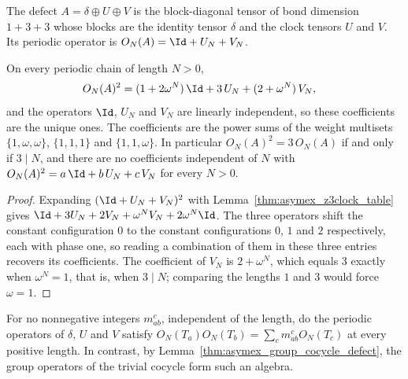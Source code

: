 \begin{definition}
    \label{def:asymex_z3clock_defect}
    \leanok
    The defect $A=\delta\oplus U\oplus V$ is the block-diagonal tensor of
    bond dimension $1+3+3$ whose blocks are the identity tensor $\delta$ and
    the clock tensors $U$ and $V$. Its periodic operator is
    $O_N(A)=\Id+U_N+V_N$.
\end{definition}

\begin{lemma}
    \label{thm:asymex_z3clock_defect_square}
    \leanok
    On every periodic chain of length $N>0$,
    \begin{align}
        O_N(A)^2 & =(1+2\omega^N)\,\Id+3\,U_N+(2+\omega^N)\,V_N,
    \end{align}
    and the operators $\Id$, $U_N$ and $V_N$ are linearly independent, so
    these coefficients are the unique ones. The coefficients are the power
    sums of the weight multisets $\{1,\omega,\omega\}$, $\{1,1,1\}$ and
    $\{1,1,\omega\}$. In particular $O_N(A)^2=3\,O_N(A)$ if and only if
    $3\mid N$, and there are no coefficients independent of $N$ with
    $O_N(A)^2=a\,\Id+b\,U_N+c\,V_N$ for every $N>0$.
\end{lemma}

\begin{proof}
    \leanok
    Expanding $(\Id+U_N+V_N)^2$ with
    Lemma~\ref{thm:asymex_z3clock_table} gives
    $\Id+3U_N+2V_N+\omega^NV_N+2\omega^N\Id$. The three operators shift the
    constant configuration $0$ to the constant configurations $0$, $1$ and
    $2$ respectively, each with phase one, so reading a combination of them
    in these three entries recovers its coefficients. The coefficient of
    $V_N$ is $2+\omega^N$, which equals $3$ exactly when $\omega^N=1$, that
    is, when $3\mid N$; comparing the lengths $1$ and $3$ would force
    $\omega=1$.
\end{proof}

\begin{lemma}
    \label{thm:asymex_z3clock_not_fusion_algebra}
    \leanok
    For no nonnegative integers $m_{ab}^{c}$, independent of the length, do
    the periodic operators of $\delta$, $U$ and $V$ satisfy
    $O_N(T_a)O_N(T_b)=\sum_cm_{ab}^{c}O_N(T_c)$ at every positive length.
    In contrast, by Lemma~\ref{thm:asymex_group_cocycle_defect}, the group
    operators of the trivial cocycle form such an algebra.
\end{lemma}

